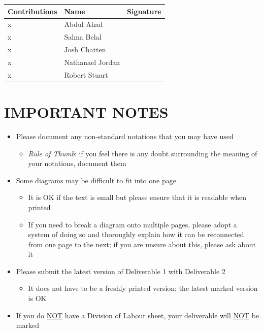 \documentclass[titlepage,12pt]{article}
\begin{document}
\begin{table}[htbp]
\vspace{-0.06in}
\begin{center}
\setlength{\extrarowheight}{4.0pt}
\begin{tabular}{m{} m{} m{}} 
\hline
\textbf{Contributions} & \textbf{Name} & \textbf{Signature}\\
\hline
x & Abdul Ahad & \\
\hline
x & Salma Belal & \\
\hline
x & Josh Chatten & \\
\hline
x & Nathanael Jordan  & \\
\hline
x & Robert Stuart & \\
\hline
\end{tabular}
\end{center}
\label{divOfLabour}
\end{table}


\newpage
\section*{IMPORTANT NOTES}
\begin{itemize}
    \item Please document any non-standard notations that you may have used
    \begin{itemize}
        \item \emph{Rule of Thumb}: if you feel there is any doubt surrounding the meaning of your
        notations, document them
    \end{itemize}
    \item Some diagrams may be difficult to fit into one page
    \begin{itemize}
        \item It is OK if the text is small but please ensure that it is readable when printed
        \item If you need to break a diagram onto multiple pages, please adopt a system of doing so
        and thoroughly explain how it can be reconnected from one page to the next; if you are
        unsure about this, please ask about it
    \end{itemize}
    \item Please submit the latest version of Deliverable 1 with Deliverable 2
    \begin{itemize}
        \item It does not have to be a freshly printed version; the latest marked version is OK
    \end{itemize}
    \item If you do \underline{NOT} have a Division of Labour sheet, your deliverable will
    \underline{NOT} be marked
\end{itemize}
\end{document}
